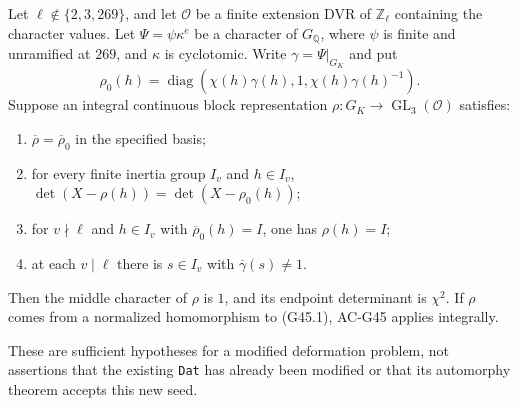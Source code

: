 \begin{proposition}
\label{AC-G45-local}
Let $\ell\notin\{2,3,269\}$, and let $\mathcal O$ be a finite
extension DVR of $\mathbb Z_\ell$ containing the character values.
Let $\Psi=\psi\kappa^e$ be a character of $G_{\mathbb Q}$,
where $\psi$ is finite and unramified at $269$, and $\kappa$
is cyclotomic.  Write $\gamma=\Psi|_{G_K}$ and put
\[
        \rho_0(h)=\operatorname{diag}
                    (\chi(h)\gamma(h),1,\chi(h)\gamma(h)^{-1}).
                                                               \tag{G45.5}
\]
Suppose an integral continuous block representation
$\rho:G_K\to\operatorname{GL}_3(\mathcal O)$ satisfies:
\begin{enumerate}
\item $\overline\rho=\overline\rho_0$ in the specified basis;
\item for every finite inertia group $I_v$ and $h\in I_v$,
      $\det(X-\rho(h))=\det(X-\rho_0(h))$;
\item for $v\nmid\ell$ and $h\in I_v$ with
      $\overline\rho_0(h)=I$, one has $\rho(h)=I$;
\item at each $v\mid\ell$ there is $s\in I_v$ with
      $\overline\gamma(s)\ne1$.
\end{enumerate}
Then the middle character of $\rho$ is $1$, and its endpoint
determinant is $\chi^2$.  If $\rho$ comes from a normalized
homomorphism to (G45.1), AC-G45 applies integrally.

These are sufficient hypotheses for a modified deformation problem,
not assertions that the existing \texttt{Dat} has already been
modified or that its automorphy theorem accepts this new seed.
\end{proposition}
